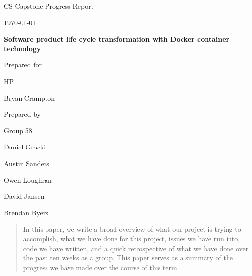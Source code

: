 \documentclass[onecolumn, draftclsnofoot,10pt, compsoc]{IEEEtran}
\def \CapstoneTeamName{		The Cleverly Named Team}
\def \CapstoneTeamNumber{		58}
\def \GroupMemberOne{			Daniel Grocki}
\def \GroupMemberTwo{			Austin Sanders}
\def \GroupMemberThree{			Owen Loughran}
\def \GroupMemberFour{			David Jansen}
\def \GroupMemberFive{			Brendan Byers}
\def \CapstoneProjectName{		Software product life cycle transformation with Docker container technology}
\def \CapstoneSponsorCompany{	HP}
\def \CapstoneSponsorPerson{		Bryan Crampton}
\def \DocType{		%
				Progress Report
				}
\newcommand{\NameSigPair}[1]{\par
\makebox[2.75in][r]{#1} \hfil 	\makebox[3.25in]{\makebox[2.25in]{\hrulefill} \hfill		\makebox[.75in]{\hrulefill}}
\par\vspace{-12pt} \textit{\tiny\noindent
\makebox[2.75in]{} \hfil		\makebox[3.25in]{\makebox[2.25in][r]{Signature} \hfill	\makebox[.75in][r]{Date}}}}
\renewcommand{\NameSigPair}[1]{#1}
\begin{document}
\begin{titlepage}
    \begin{singlespace}
        \hfill 
        \par\vspace{.2in}
        \centering
        \scshape{
            \huge CS Capstone \DocType \par
            {\large\today}\par
            \vspace{.5in}
            \textbf{\Huge\CapstoneProjectName}\par
            \vfill
            {\large Prepared for}\par
            \Huge \CapstoneSponsorCompany\par
            \vspace{5pt}
            {\Large\NameSigPair{\CapstoneSponsorPerson}\par}
            {\large Prepared by }\par
            Group\CapstoneTeamNumber\par
            \vspace{5pt}
            {\Large
                \NameSigPair{\GroupMemberOne}\par
                \NameSigPair{\GroupMemberTwo}\par
                \NameSigPair{\GroupMemberThree}\par
                \NameSigPair{\GroupMemberFour}\par
                \NameSigPair{\GroupMemberFive}\par
            }
            \vspace{20pt}
        }
        \begin{abstract}
        
        In this paper, we write a broad overview of what our project is trying to accomplish, what we have done for this project, issues we have run into, code we have written, and a quick retrospective of what we have done over the past ten weeks as a group. This paper serves as a summary of the progress we have made over the course of this term.

        \end{abstract}     
    \end{singlespace}
\end{titlepage}
\newpage
{}
\clearpage
\end{document}

